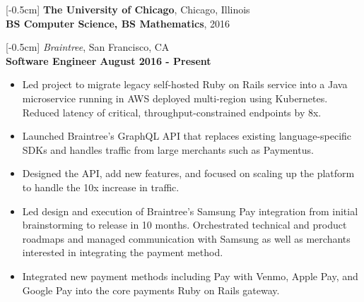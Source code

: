 \documentclass[9pt]{res} %
\begin{document}

\address{
    178 Church Street\\  
    San Francisco, CA 94114 \\   
    \href{mailto:kira.ghandhi@gmail.com}{kira.ghandhi@gmail.com}  $\bullet$ (650)743-8198 $\bullet$ \url{https://github.com/kghandhi} \\
}

\begin{resume}                         
[-0.5cm]  
\textbf{\color{Maroon}The University of Chicago}, Chicago, Illinois \\
\textbf{BS Computer Science, BS Mathematics}, 2016 \\
\vspace{-4pt}

[-0.5cm]
\textit{\color{MidnightBlue}Braintree}, San Francisco, CA \\
\textbf{Software Engineer}
\hspace*{\fill} \textbf{August 2016 - Present}
\begin{itemize}
\item Led project to migrate legacy self-hosted Ruby on Rails service into a Java microservice running in AWS deployed multi-region using Kubernetes. Reduced latency of critical, throughput-constrained endpoints by 8x.
\item Launched Braintree's GraphQL API that replaces existing language-specific SDKs and handles traffic from large merchants such as Paymentus. 
\item Designed the API, add new features, and focused on scaling up the platform to handle the 10x increase in traffic. 
\item Led design and execution of Braintree's Samsung Pay integration from initial brainstorming to release in 10 months. Orchestrated technical and product roadmaps and managed communication with Samsung as well as merchants interested in integrating the payment method.
\item Integrated new payment methods including Pay with Venmo, Apple Pay, and Google Pay into the core payments Ruby on Rails gateway.
\end{itemize}


\end{resume}
\end{document}
